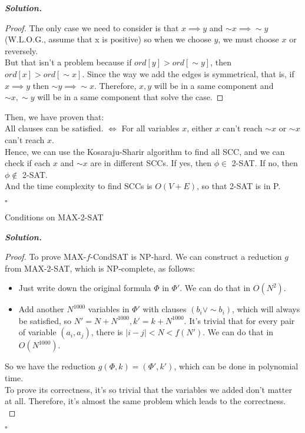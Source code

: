 \documentclass[12pt, a4paper, UTF8]{article}
\newenvironment{solution}[1][\it{Solution}]{\textbf{#1. }\\}{\begin{flushright}$\square$\end{flushright}}
\begin{document}
\begin{subprobs}
\begin{solution}
\begin{itemize}
\begin{proof}
            The only case we need to consider is that $x \implies y$ and $\sim{}x \implies \sim{}y$ (W.L.O.G., assume that x is positive) so when we choose $y$, we must choose $x$ or reversely.\\
            But that isn't a problem because if $ord[y] > ord[\sim{}y]$, then $ord[x] > ord[\sim{}x]$. Since the way we add the edges is symmetrical, that is, if $x \implies y$ then $\sim{}y \implies \sim{}x$. Therefore, $x, y$ will be in a same component and $\sim{}x, \sim{}y$ will be in a same component that solve the case.
        \end{proof}
        \end{itemize}
        Then, we have proven that:\\
        All clauses can be satisfied. $\iff$ For all variables $x$, either $x$ can't reach $\sim{}x$ or $\sim{}x$ can't reach $x$.\\
        Hence, we can use the Kosaraju-Sharir algorithm to find all SCC, and we can check if each $x$ and $\sim{}x$ are in different SCCs. If yes, then $\phi \in$ 2-SAT. If no, then $\phi \not\in$ 2-SAT.\\
        And the time complexity to find SCCs is $O(V + E)$, so that 2-SAT is in P.
    \end{solution}
\item Conditions on MAX-2-SAT
\begin{subprobs}
\item
    \begin{solution}
        \begin{proof} To prove MAX-$f$-CondSAT is NP-hard.
        We can construct a reduction $g$ from MAX-2-SAT, which is NP-complete, as follows:\\
        \begin{itemize} 
            \item Just write down the original formula $\Phi$ in $\Phi'$. We can do that in $O(N^2)$.
        \item Add another $N^{1000}$ variables in $\Phi'$ with clauses $(b_i \vee \sim{}b_i)$, which will always be satisfied, so $N' = N + N^{1000}, k' = k + N^{1000}$. It's trivial that for every pair of variable $(a_i, a_j)$, there is $|i - j| < N < f(N')$. We can do that in $O(N^{1000})$. 
        \end{itemize}
        So we have the reduction $g(\Phi, k) = (\Phi', k')$, which can be done in polynomial time.\\
        To prove its correctness, it's so trivial that the variables we added don't matter at all. Therefore, it's almost the same problem which leads to the correctness.\\

\end{proof}
\end{solution}
\end{subprobs}
\end{subprobs}
\end{document}

